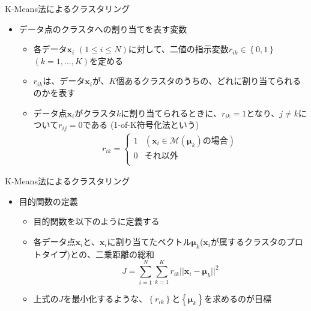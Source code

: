 \documentclass[dvipdfmx,notheorems,t]{beamer}
\begin{document}
\begin{frame}{K-Means法によるクラスタリング}

\begin{itemize}
	\item データ点のクラスタへの割り当てを表す変数
	\begin{itemize}
		\item 各データ$\bm{x}_i$ $(1 \le i \le N)$に対して、二値の指示変数$r_{ik} \in \left\{ 0, 1 \right\}$ $(k = 1, \ldots, K)$を定める
		\newline
		\item $r_{ik}$は、データ$\bm{x}_i$が、$K$個あるクラスタのうちの、どれに割り当てられるのかを表す
		\newline
		\item データ点$\bm{x}_i$がクラスタ$k$に割り当てられるときに、$r_{ik} = 1$となり、$j \neq k$について$r_{ij} = 0$である (\alert{1-of-K符号化法}という)
		\begin{eqnarray}
			r_{ik} = \left\{ \begin{array}{ll}
				1 & (\bm{x}_i \in \mathcal{M}(\bm{\mu}_k) \text{の場合}) \\
				0 & \text{それ以外} \\ \end{array} \right. \end{eqnarray}
	\end{itemize}
\end{itemize}

\end{frame}

\begin{frame}{K-Means法によるクラスタリング}

\begin{itemize}
	\item 目的関数の定義
	\begin{itemize}
		\item 目的関数を以下のように定義する
		\item 各データ点$\bm{x}_i$と、$\bm{x}_i$に割り当てたベクトル$\bm{\mu}_k$($\bm{x}_i$が属するクラスタのプロトタイプ)との、二乗距離の総和
		\begin{equation}
			J = \sum_{i = 1}^N \sum_{k = 1}^K r_{ik} || \bm{x}_i - \bm{\mu}_k ||^2
		\end{equation}
		
		\item 上式の$J$を\alert{最小化}するような、$\left\{ r_{ik} \right\}$と$\left\{ \bm{\mu}_k \right\}$を求めるのが目標
	\end{itemize}
\end{itemize}

\end{frame}
\end{document}
